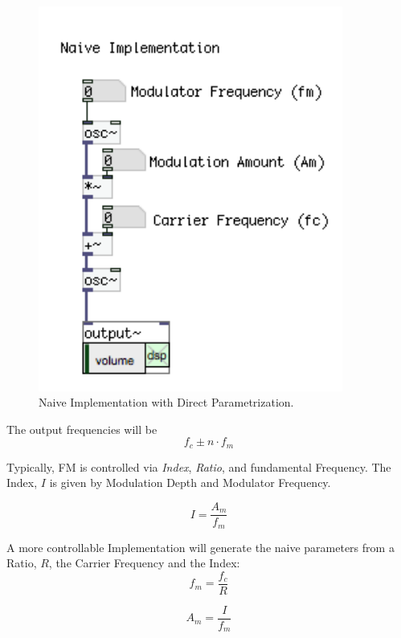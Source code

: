 \begin{figure}[H]
	\begin{center}
		\includegraphics[width = 10cm]{img/FMnaive.png}
		\caption{Naive Implementation with Direct Parametrization.}
		\label{fig:fmNaive}
	\end{center}
\end{figure}

The output frequencies will be
\begin{equation}
	f_c \pm n \cdot f_m
\end{equation}

Typically, FM is controlled via \textit{Index}, \textit{Ratio}, and fundamental Frequency. The Index, ${I}$ is given by Modulation Depth and Modulator Frequency.

\begin{equation}
I = \frac{A_m}{f_m}
\end{equation}

A more controllable Implementation will generate the naive parameters from a Ratio, ${R}$, the Carrier Frequency and the Index:
\begin{equation}
	f_m = \frac{f_c}{R}
\end{equation}

\begin{equation}
	A_m = \frac{I}{f_m}
\end{equation}

